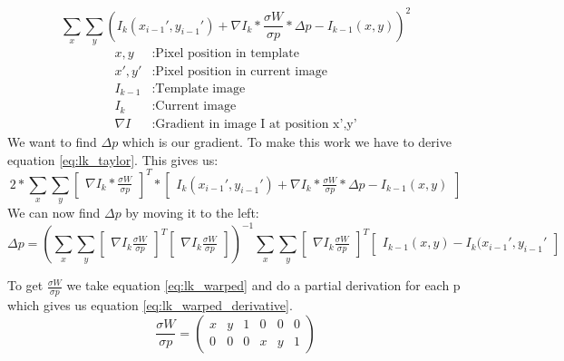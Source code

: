 \documentclass[11pt,a4paper,titlepage,oneside]{report}
\begin{document}
\begin{equation}\label{eq:lk_taylor}
	\sum_x\sum_y(I_{k}(x_{i-1}',y_{i-1}')+\nabla I_{k}*\frac{\sigma W}{\sigma p}*\Delta p-I_{k-1}(x,y))^2
\end{equation}
\begin{align*}
	x,y				&:	\text{Pixel position in template}\\
	x',y'			&:	\text{Pixel position in current image}\\
	I_{k-1}		&:	\text{Template image}\\
	I_{k}			&:	\text{Current image}\\
	\nabla I	&:	\text{Gradient in image I at position x',y'}
\end{align*}
We want to find $\Delta p$ which is our gradient. To make this work we have to derive equation \ref{eq:lk_taylor}. This gives us:
\begin{equation}
	2*\sum_x\sum_y\begin{bmatrix}\nabla I_{k}*\frac{\sigma W}{\sigma p}\end{bmatrix}^T*\begin{bmatrix}I_{k}(x_{i-1}',y_{i-1}')+\nabla I_{k}*\frac{\sigma W}{\sigma p}*\Delta p-I_{k-1}(x,y)\end{bmatrix}
\end{equation}
We can now find $\Delta p$ by moving it to the left:
\tiny
\begin{equation}\label{eq:lk_dp}
	\Delta p=(\sum_x\sum_y\begin{bmatrix}\nabla I_{k}\frac{\sigma W}{\sigma p}\end{bmatrix}^T\begin{bmatrix}\nabla I_{k}\frac{\sigma W}{\sigma p}\end{bmatrix})^{-1}
	\sum_x\sum_y\begin{bmatrix}\nabla I_{k}\frac{\sigma W}{\sigma p}\end{bmatrix}^T\begin{bmatrix}I_{k-1}(x,y) - I_{k}(x_{i-1}',y_{i-1}'\end{bmatrix}
\end{equation}
\normalsize

To  get $\frac{\sigma W}{\sigma p}$ we take equation \ref{eq:lk_warped} and do a partial derivation for each p which gives us equation \ref{eq:lk_warped_derivative}.
\begin{equation}\label{eq:lk_warped_derivative}
	\frac{\sigma W}{\sigma p}=
	\begin{pmatrix}
		x & y & 1 & 0 & 0 & 0 \\
		0 & 0 & 0 & x & y & 1
	\end{pmatrix}
\end{equation}
\end{document}
